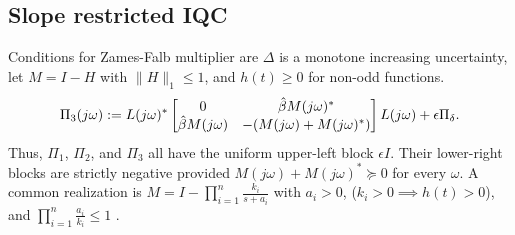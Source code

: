 \documentclass[journal,10pt,doublecolumn,twoside,a4paper]{IEEEtran}
\begin{document}
\subsection{Slope restricted IQC}
Conditions for Zames-Falb multiplier are $\Delta$ is a monotone increasing uncertainty, let $M = I - H$
with $\|H\|_1 \leq 1$, and $h(t) \geq 0$ for non-odd functions.
\begin{equation*}
\Pi_3(j\omega)
:=L(j\omega)^*
\begin{bmatrix}
0&\hat\beta M(j\omega)^*\\
\hat\beta M(j\omega)&-(M(j\omega)+M(j\omega)^*)
\end{bmatrix}
L(j\omega)+\epsilon \Pi_\delta.
\end{equation*}
Thus, $\Pi_1$, $\Pi_2$, and $\Pi_3$ all have the uniform upper-left block
$\epsilon I$. Their lower-right blocks are strictly negative provided
$M(j\omega)+M(j\omega)^*\succeq0$ for every $\omega$.
A common realization is $M = I - \prod_{i=1}^{n}\frac{k_i}{s+a_i}$ with $a_i>0$, ($k_i>0 \implies h(t)>0$), 
and $\prod_{i=1}^{n}\frac{a_i}{k_i}\leq1$ \cite{turner2022zamesfalbmultipliersdontpanic}. 



\end{document}
